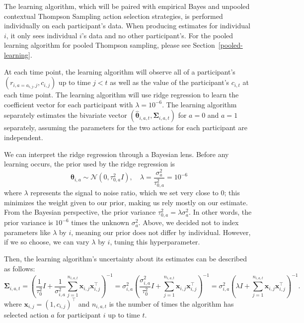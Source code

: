 \documentclass[letterpaper, 9pt]{extarticle}
\newcounter{samcommentcounter}
\newcounter{nyscommentcounter}
\newcommand{\sam}[1]{%
  \stepcounter{samcommentcounter}%
  {\color{blue} [\textbf{SAM} (\thesamcommentcounter): {#1}]}%
}
\newcommand{\nys}[1]{%
  \stepcounter{nyscommentcounter}%
  {\color{nyscolor} [\textbf{NYS} (\thenyscommentcounter): {#1}]}%
}
\begin{document}
The learning algorithm, which will be paired with empirical Bayes and unpooled contextual Thompson Sampling action selection strategies, is performed individually on each participant's data. When producing estimates for individual $i$, it only sees individual $i$'s data and no other participant's. For the pooled learning algorithm for pooled Thompson sampling, please see Section~\ref{pooled-learning}.

At each time point, the learning algorithm will observe all of a participant's $(r_{i,a=a_{i,j}, j}, c_{i,j})$ up to time $j<t$ 
as well as the value of the participant's $c_{i,t}$ at each time point. The learning algorithm will use ridge regression to learn the coefficient vector for each participant with $\lambda=10^{-6}$. The learning algorithm separately estimates the bivariate vector $(\hat{\boldsymbol{\theta}}_{i,a,t}, \boldsymbol{\Sigma}_{i,a,t})$ for $a=0$ and $a=1$ separately, assuming the parameters for the two actions for each participant are independent.  %

We can interpret the ridge regression through a Bayesian lens. Before any learning occurs, the prior used by the ridge regression is
$$\boldsymbol{\theta}_{i,a} \sim \mathcal{N}(0, \tau_{0,a}^2 I), \quad \lambda = \frac{\sigma_a^2}{\tau_{0,a}^2}
=10^{-6}$$
where $\lambda$ represents the signal to noise ratio, which we set very close to 0; this minimizes the weight given to our prior, making us rely mostly on our estimate. From the Bayesian perspective, the prior variance $\tau^2_{0,a}=\lambda \sigma_{a}^2$. In other words, the prior variance is $10^{-6}$ times the unknown $\sigma_a^2$. 
Above, we decided not to index parameters like $\lambda$ by $i$, meaning our prior does not differ by individual. However, if we so choose, we can vary $\lambda$ by $i$, tuning this hyperparameter.

Then, the learning algorithm's uncertainty about its estimates can be described as follows: 
\[
\boldsymbol{\Sigma}_{i,a,t}
=
\left(
\frac{1}{\tau_0^2} I
+
\frac{1}{\sigma_{i,a}^2}
\sum_{j=1}^{n_{i,a,t}} \boldsymbol{x}_{i,j}\boldsymbol{x}_{i,j}^\top
\right)^{-1}
=
\sigma_{i,a}^2
\left(
\frac{\sigma_{i,a}^2}{\tau_0^2} I
+
\sum_{j=1}^{n_{i,a,t}} \boldsymbol{x}_{i,j}\boldsymbol{x}_{i,j}^\top
\right)^{-1}
=
\sigma_{i,a}^2
\left(
\lambda I
+
\sum_{j=1}^{n_{i,a,t}} \boldsymbol{x}_{i,j}\boldsymbol{x}_{i,j}^\top
\right)^{-1}.
\]
where $\boldsymbol{x}_{i,j} = (1, c_{i,j})^\top$ and $n_{i,a,t}$ is the number of times the algorithm has selected action $a$ for participant $i$ up to time $t$.  
\end{document}
